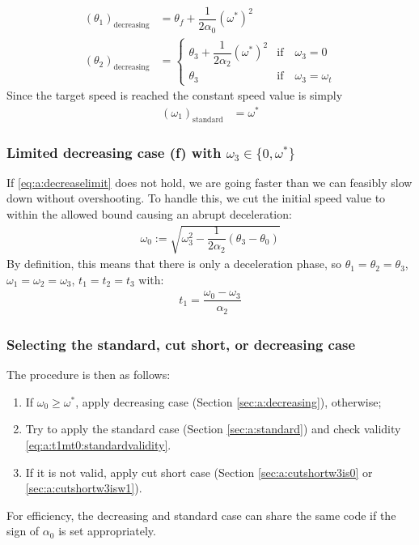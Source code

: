 \documentclass[12pt, a4paper]
{article}
\providecommand{\lr}[1]{\left(#1\right)}
\providecommand{\sub}[1]{_{\text{#1}}}
\providecommand{\w}{\omega}
\providecommand{\wt}{\w^*}
\renewcommand{\th}{\theta}
\renewcommand{\a}{\alpha}
\begin{document}
\begin{align}
    \label{eq:a:t1mt0:decreasing}
    \lr{\th_1}\sub{decreasing} &= \th_f  + \dfrac{1}{2\a_0}(\wt)^2\\[1em]
    \lr{\th_2}\sub{decreasing} &=
        \begin{cases}
        \th_3  + \dfrac{1}{2\a_2}(\wt)^2 & \text{if} \quad \w_3 = 0\\ 
        \th_3 &  \text{if} \quad\w_3 = \w_t
        \end{cases}
\end{align}
%
Since the target speed is reached the constant speed value is simply
\begin{align}
    \lr{\w_1}\sub{standard} &= \wt
\end{align}

\subsubsection{Limited decreasing case (f) with $\w_3 \in \{0, \wt\}$}

If \eqref{eq:a:decreaselimit} does not hold, we are going faster than we
can feasibly slow down without overshooting. To handle this, we cut the
initial speed value to within the allowed bound causing an abrupt deceleration:
%
\begin{align}
    \w_0 := \sqrt{\w_3^2 - \dfrac{1}{2\a_2}\lr{\th_3-\th_0}}
\end{align}
%
By definition, this means that there is only a deceleration phase, so
$\th_1 = \th_2 = \th_3$, $\w_1=\w_2=\w_3$, $t_1=t_2=t_3$ with:
%
\begin{align}
    \label{eq:a:decreaselimittime}
    t_1 = \dfrac{\w_0-\w_3}{\a_2}
\end{align}

\subsubsection{Selecting the standard, cut short, or decreasing case}
\label{sec:a:selectionprocedure}
The procedure is then as follows:
\begin{enumerate}
    \item If $\w_0 \geq \wt$, apply decreasing case (Section
    \ref{sec:a:decreasing}), otherwise;
    \item Try to apply the standard case (Section \ref{sec:a:standard}) and
    check validity \eqref{eq:a:t1mt0:standardvalidity}.
    \item If it is not valid, apply cut short case (Section
    \ref{sec:a:cutshortw3is0} or \ref{sec:a:cutshortw3isw1}).
\end{enumerate}
%
For efficiency, the decreasing and standard case can share the same code if the
sign of $\a_0$ is set appropriately.
\end{document}
